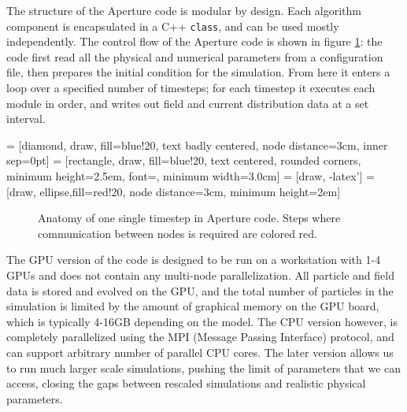 The structure of the Aperture code is modular by design. Each algorithm
component is encapsulated in a C++ \verb!class!, and can be used mostly
independently. The control flow of the Aperture code is shown in figure
\ref{fig:aperture-flow}: the code first read all the physical and numerical
parameters from a configuration file, then prepares the initial condition for
the simulation. From here it enters a loop over a specified number of timesteps;
for each timestep it executes each module in order, and writes out field and
current distribution data at a set interval.

 = [diamond, draw, fill=blue!20,
    text badly centered, node distance=3cm, inner sep=0pt]
 = [rectangle, draw, fill=blue!20,
text centered, rounded corners, minimum height=2.5em,
font=\small\sffamily, minimum width=3.0cm]
 = [draw, -latex']
 = [draw, ellipse,fill=red!20, node distance=3cm,
    minimum height=2em]
\begin{figure}[h]
  \centering
  \caption{Anatomy of one single timestep in Aperture code. Steps where
    communication between nodes is required are colored red.}
  \label{fig:aperture-flow}
\end{figure}

The GPU version of the code is designed to be run on a workstation with 1-4 GPUs
and does not contain any multi-node parallelization. All particle and field data
is stored and evolved on the GPU, and the total number of particles in the
simulation is limited by the amount of graphical memory on the GPU board, which
is typically 4-16GB depending on the model. The CPU version however, is
completely parallelized using the MPI (Message Passing Interface) protocol, and
can support arbitrary number of parallel CPU cores. The later version allows us
to run much larger scale simulations, pushing the limit of parameters that we
can access, closing the gaps between rescaled simulations and realistic physical
parameters.

